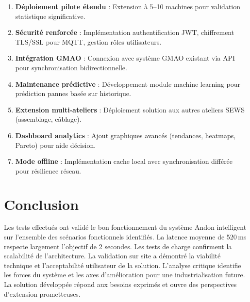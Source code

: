 \begin{enumerate}
    \item \textbf{Déploiement pilote étendu} : Extension à 5--10 machines pour validation statistique significative.
    \item \textbf{Sécurité renforcée} : Implémentation authentification JWT, chiffrement TLS/SSL pour MQTT, gestion rôles utilisateurs.
    \item \textbf{Intégration GMAO} : Connexion avec système GMAO existant via API pour synchronisation bidirectionnelle.
    \item \textbf{Maintenance prédictive} : Développement module machine learning pour prédiction pannes basée sur historique.
    \item \textbf{Extension multi-ateliers} : Déploiement solution aux autres ateliers SEWS (assemblage, câblage).
    \item \textbf{Dashboard analytics} : Ajout graphiques avancés (tendances, heatmaps, Pareto) pour aide décision.
    \item \textbf{Mode offline} : Implémentation cache local avec synchronisation différée pour résilience réseau.
\end{enumerate}

\section*{Conclusion}

Les tests effectués ont validé le bon fonctionnement du système Andon intelligent sur l'ensemble des scénarios fonctionnels identifiés. La latence moyenne de 520\,ms respecte largement l'objectif de 2 secondes. Les tests de charge confirment la scalabilité de l'architecture. La validation sur site a démontré la viabilité technique et l'acceptabilité utilisateur de la solution. L'analyse critique identifie les forces du système et les axes d'amélioration pour une industrialisation future. La solution développée répond aux besoins exprimés et ouvre des perspectives d'extension prometteuses.

\clearpage
